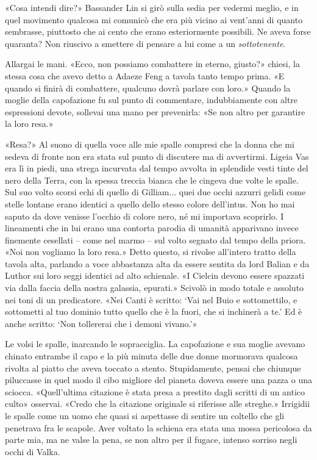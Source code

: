 «Cosa intendi dire?» Bassander Lin si girò sulla sedia per vedermi
meglio, e in quel movimento qualcosa mi comunicò che era più vicino ai
vent'anni di quanto sembrasse, piuttosto che ai cento che erano
esteriormente possibili. Ne aveva forse quaranta? Non riuscivo a
smettere di pensare a lui come a un \emph{sottotenente}.

Allargai le mani. «Ecco, non possiamo combattere in eterno, giusto?»
chiesi, la stessa cosa che avevo detto a Adaeze Feng a tavola tanto
tempo prima. «E quando si finirà di combattere, qualcuno dovrà parlare
con loro.» Quando la moglie della capofazione fu sul punto di
commentare, indubbiamente con altre espressioni devote, sollevai una
mano per prevenirla: «Se non altro per garantire la loro resa.»

«Resa?» Al suono di quella voce alle mie spalle compresi che la donna
che mi sedeva di fronte non era stata sul punto di discutere ma di
avvertirmi. Ligeia Vas era lì in piedi, una strega incurvata dal tempo
avvolta in splendide vesti tinte del nero della Terra, con la spessa
treccia bianca che le cingeva due volte le spalle. Sul suo volto scorsi
echi di quello di Gilliam... quei due occhi azzurri gelidi come stelle
lontane erano identici a quello dello stesso colore dell'intus. Non ho
mai saputo da dove venisse l'occhio di colore nero, né mi importava
scoprirlo. I lineamenti che in lui erano una contorta parodia di umanità
apparivano invece finemente cesellati -- come nel marmo -- sul volto
segnato dal tempo della priora. «Noi non vogliamo la loro resa.» Detto
questo, si rivolse all'intero tratto della tavola alta, parlando a voce
abbastanza alta da essere sentita da lord Balian e da Luthor sui loro
seggi identici ad alto schienale. «I Cielcin devono essere spazzati via
dalla faccia della nostra galassia, epurati.» Scivolò in modo totale e
assoluto nei toni di un predicatore. «Nei Canti è scritto: `Vai nel Buio
e sottomettilo, e sottometti al tuo dominio tutto quello che è la fuori,
che si inchinerà a te.' Ed è anche scritto: `Non tollererai che i demoni
vivano.'»

Le volsi le spalle, inarcando le sopracciglia. La capofazione e sua
moglie avevano chinato entrambe il capo e la più minuta delle due donne
mormorava qualcosa rivolta al piatto che aveva toccato a stento.
Stupidamente, pensai che chiunque piluccasse in quel modo il cibo
migliore del pianeta doveva essere una pazza o una sciocca.
«Quell'ultima citazione è stata presa a prestito dagli scritti di un
antico culto» osservai. «Credo che la citazione originale si riferisse
alle streghe.» Irrigidii le spalle come un uomo che quasi si aspettasse
di sentire un coltello che gli penetrava fra le scapole. Aver voltato la
schiena era stata una mossa pericolosa da parte mia, ma ne valse la
pena, se non altro per il fugace, intenso sorriso negli occhi di Valka.

